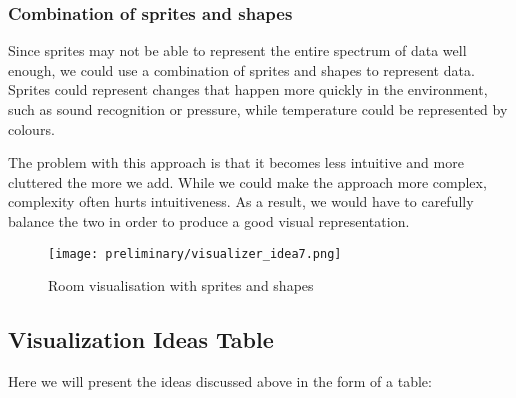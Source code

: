 \documentclass[../document]{subfiles}
\begin{document}
\subsubsection{Combination of sprites and shapes}

Since sprites may not be able to represent the entire spectrum of data well enough, we could use a combination of sprites and shapes to represent data. Sprites could represent changes that happen more quickly in the environment, such as sound recognition or pressure, while temperature could be represented by colours.

The problem with this approach is that it becomes less intuitive and more cluttered the more we add. While we could make the approach more complex, complexity often hurts intuitiveness. As a result, we would have to carefully balance the two in order to produce a good visual representation.

\begin{figure}
\texttt{[image: preliminary/visualizer\_idea7.png]}
\caption{Room visualisation with sprites and shapes}
\end{figure}

\subsection{Visualization Ideas Table}
Here we will present the ideas discussed above in the form of a table:
\end{document}
